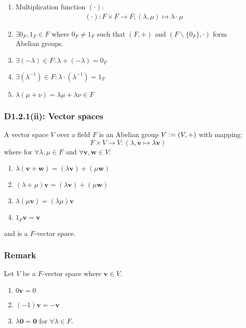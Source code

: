 \documentclass{article}
\newcommand{\deq}{\vcentcolon=}
\newcommand{\vc}[1]{\boldsymbol{#1}}
\begin{document}
\begin{multicols*}{3}
\begin{enumerate}
    \item Multiplication function $(\cdot)$:
    \begin{align*}
        (\cdot):F\times F\rightarrow F;
        (\lambda,\mu)\mapsto\lambda\cdot\mu
    \end{align*}

    \item $\exists 0_F,1_F\in F$
    where $0_F\neq1_F$ such that 
    $(F,+)$ and $(F\backslash\{0_F\},\cdot)$
    form Abelian groups.

    \item $\exists (-\lambda)\in F:
    \lambda+(-\lambda)=0_F$

    \item $\exists (\lambda^{-1})\in F:
    \lambda\cdot(\lambda^{-1})=1_F$

    \item $\lambda(\mu+\nu)
    =\lambda\mu+\lambda\nu\in F$
\end{enumerate}

\subsubsection*{D1.2.1(ii): Vector spaces}
A vector space $V$ over a field $F$ is an Abelian group $V\deq(V,+)$
with mapping:
$$F\times V\rightarrow V:
(\lambda,\vc{v}\mapsto
\lambda\vc{v})$$
where for $\forall\lambda, \mu\in F$ and
$\forall\vc{v},\vc{w}\in V$:
\begin{enumerate}
    \item
    $\lambda(\vc{v}+\vc{w})
    =(\lambda\vc{v})+(\mu\vc{w})$

    \item $(\lambda+\mu)\vc{v}
    =(\lambda\vc{v})+(\mu\vc{w})$

    \item $\lambda(\mu\vc{v})=(\lambda\mu)\vc{v}$
    
    \item $1_F\vc{v}=\vc{v}$
\end{enumerate}
and is a $F$-vector space.

\subsubsection*{Remark}
Let $V$ be a $F$-vector space where $\vc{v}\in V$.
\begin{enumerate}
    \item $0\vc{v}=0$
    \item $(-1)\vc{v}=-\vc{v}$
    \item $\lambda\vc{0}=\vc{0}$
    for $\forall\lambda\in F$.
\end{enumerate}


\end{multicols*}
\end{document}
